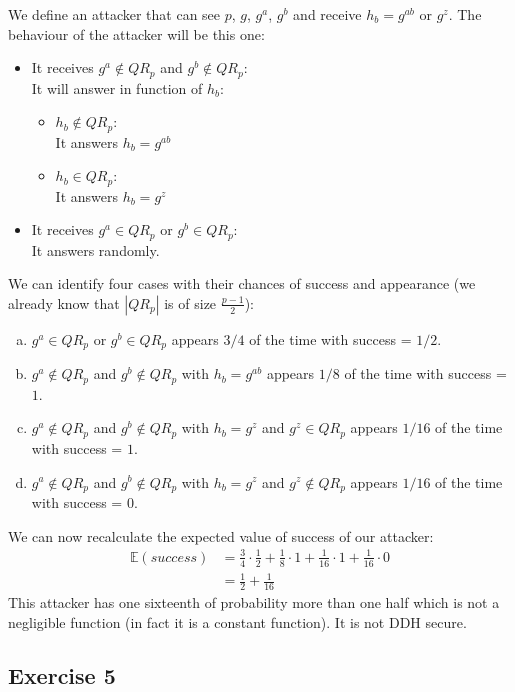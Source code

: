 \begin{solution}
\begin{enumerate}
		We define an attacker that can see $p$, $g$, $g^a$, $g^b$ and receive $h_b = g^{ab}$ or $g^z$.
		The behaviour of the attacker will be this one:
		\begin{itemize}
			\item It receives $g^a \notin QR_p$ and $g^b \notin QR_p$:\\
			It will answer in function of $h_b$:
			\begin{itemize}
				\item $h_b \notin QR_p$:\\
				It answers $h_b = g^{ab}$
				\item $h_b \in QR_p$:\\
				It answers $h_b = g^z$
			\end{itemize}
			\item It receives $g^a \in QR_p$ or $g^b \in QR_p$:\\
			It answers randomly.
		\end{itemize}
		We can identify four cases with their chances of success and appearance (we already know that $\left|QR_p\right|$ is of size $\frac{p-1}{2}$):
		\begin{enumerate}[a)]
			\item $g^a \in QR_p$ or $g^b \in QR_p$ appears $3/4$ of the time with success = $1/2$.
			\item $g^a \notin QR_p$ and $g^b \notin QR_p$ with $h_b = g^{ab}$  appears $1/8$ of the time with success = $1$.
			\item $g^a \notin QR_p$ and $g^b \notin QR_p$ with $h_b = g^z$ and $g^z \in QR_p$  appears $1/16$ of the time with success = $1$.
			\item $g^a \notin QR_p$ and $g^b \notin QR_p$ with $h_b = g^z$ and $g^z \notin QR_p$  appears $1/16$ of the time with success = $0$.
		\end{enumerate}
		We can now recalculate the expected value of success of our attacker:
		\begin{align*}
		\mathbb{E}(success) &= \frac{3}{4}\cdot \frac{1}{2} +  \frac{1}{8}\cdot 1 + \frac{1}{16}\cdot 1 + \frac{1}{16}\cdot 0\\
		&= \frac{1}{2} + \frac{1}{16}
		\end{align*}
		This attacker has one sixteenth of probability more than one half which is not a negligible function (in fact it is a constant function). It is not DDH secure.
	\end{enumerate}
\end{solution}


\subsection{Exercise 5}

